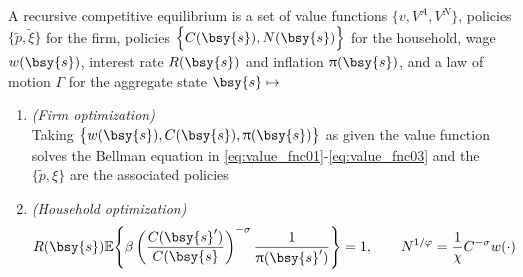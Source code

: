\documentclass[a4paper,10pt]{article}  %
\begin{document}
\newpage
\begin{equil} \small
A recursive competitive equilibrium is a set of value functions $ \Big\{ v, V^A, V^{N} \Big\} $, policies $ \big\{
\tilde{p}, \tilde{\xi} \big\} $ for the firm, policies $ \Big\{ C(\bsy{s}), N(\bsy{s}) \Big\} $ for the household, wage $
w(\bsy{s}) $, interest rate $ R(\bsy{s}) $ and inflation $ \uppi(\bsy{s}) $, and a law of motion $\Gamma$ for the aggregate
state $ \bsy{s} \mapsto $
\begin{enumerate}
   
   \item \emph{(Firm optimization)} \\
   Taking $ \big\{ w(\bsy{s}),C(\bsy{s}),\uppi(\bsy{s}) \big\}$ as given the value function solves the Bellman equation in
   \eqref{eq:value_fnc01}-\eqref{eq:value_fnc03} and the $ \{ \tilde{p}, \xi \} $ are the associated policies

   \item \emph{(Household optimization)} \\
   \[
      R(\bsy{s} )  \mathbb{E} \Bigg\{\beta \left( \frac{C(\bsy{s}')}{C(\bsy{s}} \right)^{-\sigma} \frac{ 1 }{ \uppi(\bsy{s}') } \Bigg\} = 1 , 
      \qquad
      N^{1/\varphi} = \frac{1}{\chi} C^{-\sigma}  w( \cdot )
   \]


\end{enumerate}
\end{equil}
\end{document}
